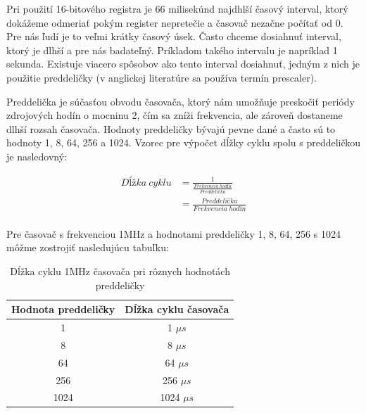 Pri použití 16-bitového registra je 66 milisekúnd najdhlší časový interval, ktorý dokážeme odmeriať pokým register nepretečie a časovač nezačne počítať od 0.
Pre nás ľudí je to veľmi krátky časový úsek. Často chceme dosiahnuť interval, ktorý je dlhší a pre nás badateľný. Príkladom takého intervalu je  napríklad 1 sekunda. Existuje viacero spôsobov ako tento interval dosiahnuť, jedným z nich je použitie preddeličky (v anglickej literatúre sa používa termín prescaler).
\par
Preddelička je súčasťou obvodu časovača, ktorý nám umožňuje preskočiť periódy zdrojových hodín o mocninu 2, čím sa zníži frekvencia, ale zároveň dostaneme dlhší rozsah časovača.
Hodnoty preddeličky bývajú pevne dané a často sú to hodnoty 1, 8, 64, 256 a 1024. Vzorec pre výpočet dĺžky cyklu spolu s preddeličkou je nasledovný:

\begin{equation}
    \begin{aligned}
        Dĺžka\:cyklu & = \frac{1}{\frac{Frekvencia\:hodín}{Preddelička}} \\
                     & = \frac{Preddelička}{Frekvencia\:hodín}           \\
    \end{aligned}
\end{equation}

Pre časovač s frekvenciou 1MHz a hodnotami preddeličky 1, 8, 64, 256 s 1024 môžme zostrojiť nasledujúcu tabuľku:
\begin{table}[!htbp]
    \begin{center}
        \begin{tabular}{|c|c|}
            \hline
            Hodnota preddeličky & Dĺžka cyklu časovača \\
            \hline
            1                   & 1 $\mu s$            \\
            8                   & 8 $\mu s$            \\
            64                  & 64 $\mu s$           \\
            256                 & 256 $\mu s$          \\
            1024                & 1024 $\mu s$         \\
            \hline
        \end{tabular}
        \caption{Dĺžka cyklu 1MHz časovača pri rôznych hodnotách preddeličky}
        \label{table:timerPrescaler}
    \end{center}
\end{table}

